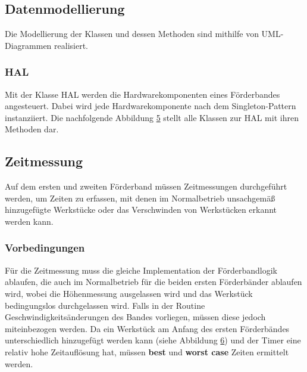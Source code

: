 \documentclass[a4paper, 11pt]{article}
\begin{document}

\subsection{Datenmodellierung}
Die Modellierung der Klassen und dessen Methoden sind mithilfe von UML-Diagrammen realisiert.
\subsubsection{HAL}
Mit der Klasse HAL werden die Hardwarekomponenten eines Förderbandes angesteuert. Dabei wird jede Hardwarekomponente nach dem Singleton-Pattern instanziiert. Die nachfolgende Abbildung \hyperref[sec:umlhal]{5} stellt alle Klassen zur HAL mit ihren Methoden dar.

\newpage

\setcounter{imgcounter}{4}

\label{sec:umlhal}
\newpage

\subsection{Zeitmessung}
Auf dem ersten und zweiten Förderband müssen Zeitmessungen durchgeführt werden, um Zeiten zu erfassen, mit denen im Normalbetrieb unsachgemäß hinzugefügte Werkstücke oder das Verschwinden von Werkstücken erkannt werden kann.

\subsubsection{Vorbedingungen}
Für die Zeitmessung muss die gleiche Implementation der Förderbandlogik ablaufen, die auch im Normalbetrieb für die beiden ersten Förderbänder ablaufen wird, wobei die Höhenmessung ausgelassen wird und das Werkstück bedingungslos durchgelassen wird. Falls in der Routine Geschwindigkeitsänderungen des Bandes vorliegen, müssen diese jedoch miteinbezogen werden.
Da ein Werkstück am Anfang des ersten Förderbändes unterschiedlich hinzugefügt werden kann (siehe Abbildung \hyperref[sec:Messpunkte]{6}) und der Timer eine relativ hohe Zeitauflösung hat, müssen \textbf{best} und \textbf{worst case} Zeiten ermittelt werden. 
\end{document}
